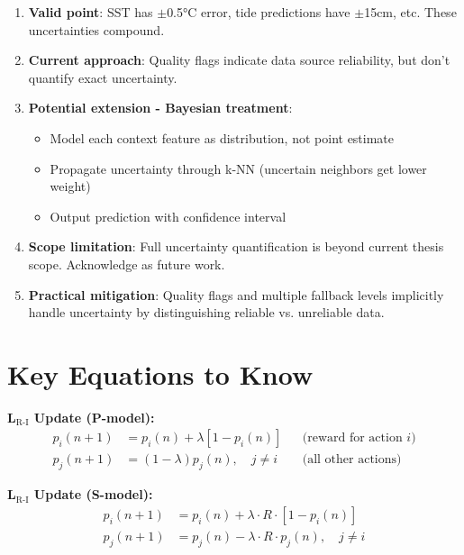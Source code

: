 \documentclass[11pt]{article}
\begin{document}
\begin{enumerate}
    \item \textbf{Valid point}: SST has $\pm$0.5°C error, tide predictions have $\pm$15cm, etc. These uncertainties compound.

    \item \textbf{Current approach}: Quality flags indicate data source reliability, but don't quantify exact uncertainty.

    \item \textbf{Potential extension - Bayesian treatment}:
    \begin{itemize}
        \item Model each context feature as distribution, not point estimate
        \item Propagate uncertainty through k-NN (uncertain neighbors get lower weight)
        \item Output prediction with confidence interval
    \end{itemize}

    \item \textbf{Scope limitation}: Full uncertainty quantification is beyond current thesis scope. Acknowledge as future work.

    \item \textbf{Practical mitigation}: Quality flags and multiple fallback levels implicitly handle uncertainty by distinguishing reliable vs. unreliable data.
\end{enumerate}

\section{Key Equations to Know}

\textbf{L$_{\text{R-I}}$ Update (P-model):}
\begin{align}
p_i(n+1) &= p_i(n) + \lambda[1 - p_i(n)] && \text{(reward for action } i\text{)}\\
p_j(n+1) &= (1-\lambda) p_j(n), \quad j \neq i && \text{(all other actions)}
\end{align}

\textbf{L$_{\text{R-I}}$ Update (S-model):}
\begin{align}
p_i(n+1) &= p_i(n) + \lambda \cdot R \cdot [1 - p_i(n)] \\
p_j(n+1) &= p_j(n) - \lambda \cdot R \cdot p_j(n), \quad j \neq i
\end{align}
\end{document}
